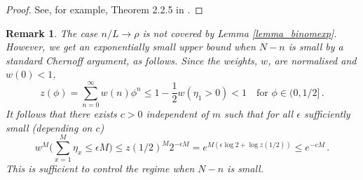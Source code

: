 \documentclass[pdflatex,sn-mathphys-num]{sn-jnl}%
\theoremstyle{thmstyleone}%
\theoremstyle{thmstyletwo}%
\newtheorem{remark}{Remark}%
\theoremstyle{thmstylethree}%
\begin{document}
\begin{proof}
    See, for example, Theorem 2.2.5 in \cite{borovkov2020}.
\end{proof}
\begin{remark}
\label{rem:lemma_binomexp}
    The case $n/L \to \rho$ is not covered by Lemma \ref{lemma_binomexp}. However, we get an exponentially small upper bound when $N-n$ is small by a standard Chernoff argument, as follows. Since the weights, $w$, are normalised and $w(0) < 1$,
    \[
    z(\phi) = \sum_{n=0}^\infty w(n)\phi^n \leq 1 - \frac{1}{2}w(\eta_1 > 0) < 1 \quad \textrm{for } \phi \in (0,1/2]\,.
    \]
    It follows that there exists $c>0$ independent of $m$ such that for all $\epsilon$ sufficiently small (depending on $c$)
    \[
     w^{M} \Big(\sum_{x=1}^{M} \eta_x \leq \epsilon M\Big) \leq z(1/2)^M 2^{-\epsilon M} = e^{M(\epsilon\log 2 + \log z(1/2))} \leq e^{-cM}\,.
    \]
    This is sufficient to control the regime when $N-n$ is small.
\end{remark}
	
\end{document}
